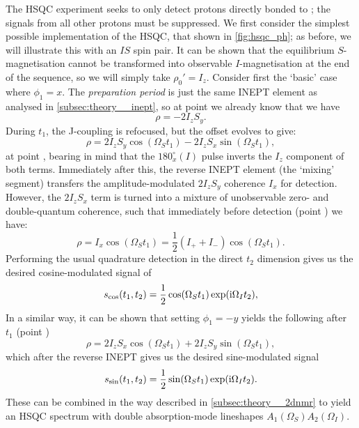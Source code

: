 The HSQC experiment seeks to only detect protons directly bonded to \carbon{}; the signals from all other protons must be suppressed.
We first consider the simplest possible implementation of the HSQC, that shown in \cref{fig:hsqc_ph}; as before, we will illustrate this with an $IS$ spin pair.
It can be shown that the equilibrium $S$-magnetisation cannot be transformed into observable $I$-magnetisation at the end of the sequence, so we will simply take $\rho_0' = I_z$.
Consider first the `basic' case where $\phi_1 = x$.
The \textit{preparation period} is just the same INEPT element as analysed in \cref{subsec:theory__inept}, so at point  we already know that we have
\begin{equation}
    \label{eq:hsqc_ph_rho_1}
    \rho = -2I_zS_y.
\end{equation}
During $t_1$, the J-coupling is refocused, but the offset evolves to give:
\begin{equation}
    \label{eq:hsqc_ph_after_t1}
    \rho = 2I_zS_y\cos(\Omega_S t_1) - 2I_zS_x \sin(\Omega_S t_1),
\end{equation}
at point , bearing in mind that the $180^\circ_x(I)$ pulse inverts the $I_z$ component of both terms.
Immediately after this, the reverse INEPT element (the `mixing' segment) transfers the amplitude-modulated $2I_zS_y$ coherence $I_x$ for detection.
However, the $2I_zS_x$ term is turned into a mixture of unobservable zero- and double-quantum coherence, such that immediately before detection (point ) we have:
\begin{equation}
    \label{eq:hsqc_ph_detection}
    \rho = I_x\cos(\Omega_S t_1) = \frac{1}{2}(I_+ + I_-)\cos(\Omega_S t_1).
\end{equation}
Performing the usual quadrature detection in the direct $t_2$ dimension gives us the desired cosine-modulated signal of
\begin{equation}
    \label{eq:hsqc_cos_signal}
    s_\text{cos}(t_1, t_2) = \frac{1}{2}\cos(\Omega_S t_1)\exp(\mathrm{i} \Omega_I t_2),
\end{equation}
In a similar way, it can be shown that setting $\phi_1 = -y$ yields the following after $t_1$ (point )
\begin{equation}
    \label{eq:hsqc_ph_after_t1_sin}
    \rho = 2I_zS_x\cos(\Omega_S t_1) + 2I_zS_y \sin(\Omega_S t_1),
\end{equation}
which after the reverse INEPT gives us the desired sine-modulated signal
\begin{equation}
    \label{eq:hsqc_sin_signal}
    s_\text{sin}(t_1, t_2) = \frac{1}{2}\sin(\Omega_S t_1)\exp(\mathrm{i} \Omega_I t_2).
\end{equation}
These can be combined in the way described in \cref{subsec:theory__2dnmr} to yield an HSQC spectrum with double absorption-mode lineshapes $A_1(\Omega_S)A_2(\Omega_I)$.


